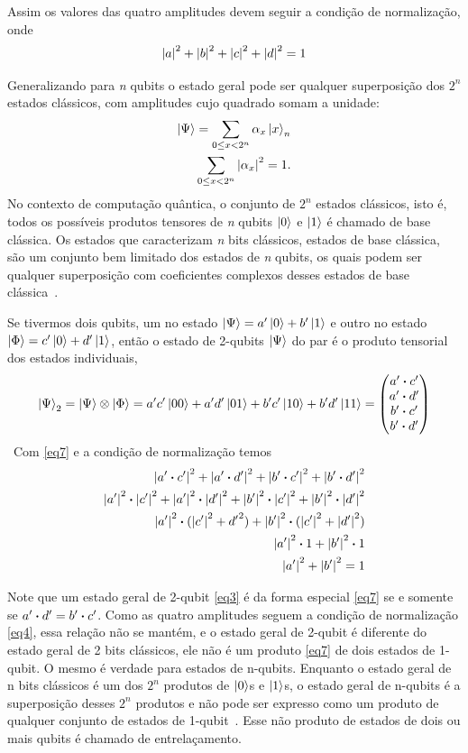 \documentclass[a4paper, 12pt, oneside]{book}
\begin{document}
Assim os valores das quatro amplitudes devem seguir a condição de normalização, onde
\begin{equation}\label{eq4}
\abs{a}^2 + \abs{b}^2 + \abs{c}^2 + \abs{d}^2 = 1
\end{equation}

Generalizando para \textit{n} qubits o estado geral pode ser qualquer superposição dos $2^n$ estados clássicos, com amplitudes cujo quadrado somam a unidade:
\begin{align*}
\ket{\Psi} = \sum_{0\leq x<2^n} \alpha_x\ket{x}_n \\
\sum_{0\leq x<2^n} \abs{\alpha_x}^2 = 1.
\end{align*}
No contexto de computação quântica, o conjunto de $2^n$ estados clássicos, isto é, todos os possíveis produtos tensores de \textit{n} qubits $\ket{0}$ e $\ket{1}$ é chamado de base clássica. Os estados que caracterizam \textit{n} bits clássicos, estados de base clássica, são um conjunto bem limitado dos estados de \textit{n} qubits, os quais podem ser qualquer superposição com coeficientes complexos desses estados de base clássica~\cite{mermin}.

Se tivermos dois qubits, um no estado $\ket{\Psi} = a'\ket{0} + b'\ket{1}$ e outro no estado $\ket{\Phi} = c'\ket{0} + d'\ket{1}$, então o estado de 2-qubits $\ket{\Psi}$ do par é o produto tensorial dos estados individuais,
\begin{equation}\label{eq7}
\ket{\Psi}_2 = \ket{\Psi}\otimes\ket{\Phi} 
= a'c'\ket{00} + a'd'\ket{01} + b'c'\ket{10} + b'd'\ket{11}
= \mqty(a' \vdot c'\\a' \vdot d'\\b' \vdot c'\\b' \vdot d')
\end{equation}\
Com \eqref{eq7} e a condição de normalização temos
\begin{align*}
\abs{a' \vdot c'}^2 + \abs{a' \vdot d'}^2 + \abs{b' \vdot c'}^2 + \abs{b' \vdot d'}^2 \\
\abs{a'}^2 \vdot \abs{c'}^2 + \abs{a'}^2 \vdot \abs{d'}^2 + \abs{b'}^2 \vdot \abs{c'}^2 + \abs{b'}^2 \vdot \abs{d'}^2 \\
\abs{a'}^2 \vdot (\abs{c'}^2 + {d'}^2) + \abs{b'}^2 \vdot (\abs{c'}^2 + \abs{d'}^2) \\
\abs{a'}^2 \vdot 1 + \abs{b'}^2 \vdot 1 \\
\abs{a'}^2 + \abs{b'}^2 = 1
\end{align*}

Note que um estado geral de 2-qubit \eqref{eq3} é da forma especial \eqref{eq7} se e somente se $a'\vdot d'=b'\vdot c'$. Como as quatro amplitudes seguem a condição de normalização \eqref{eq4}, essa relação não se mantém, e o estado geral de 2-qubit é diferente do estado geral de 2 bits clássicos, ele não é um produto \eqref{eq7} de dois estados de 1-qubit. O mesmo é verdade para estados de n-qubits. Enquanto o estado geral de n bits clássicos é um dos $2^n$ produtos de $\ket{0}$s e $\ket{1}$s, o estado geral de n-qubits é a superposição desses $2^n$ produtos e não pode ser expresso como um produto de qualquer conjunto de estados de 1-qubit~\cite{mermin}. Esse não produto de estados de dois ou mais qubits é chamado de entrelaçamento.
\end{document}
